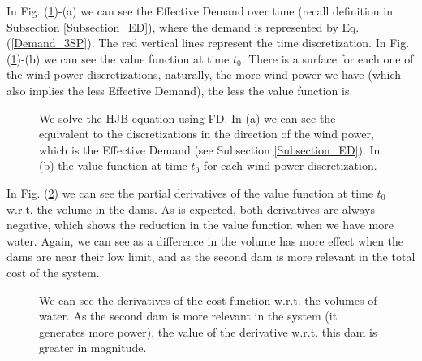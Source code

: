 In Fig. (\ref{Plot_SP3_2})-(a) we can see the Effective Demand over time (recall definition in Subsection \ref{Subsection_ED}), where the demand is represented by Eq. (\ref{Demand_3SP}). The red vertical lines represent the time discretization. In Fig. (\ref{Plot_SP3_2})-(b) we can see the value function at time $t_0$. There is a surface for each one of the wind power discretizations, naturally, the more wind power we have (which also implies the less Effective Demand), the less the value function is.

\begin{figure}[H]
\centering
{}\qquad
{}
\caption{We solve the HJB equation using FD. In (a) we can see the equivalent to the discretizations in the direction of the wind power, which is the Effective Demand (see Subsection \ref{Subsection_ED}). In (b) the value function at time $t_0$ for each wind power discretization.}
\label{Plot_SP3_2}
\end{figure}

In Fig. (\ref{Plot_SP3_3}) we can see the partial derivatives of the value function at time $t_0$ w.r.t. the volume in the dams. As is expected, both derivatives are always negative, which shows the reduction in the value function when we have more water. Again, we can see as a difference in the volume has more effect when the dams are near their low limit, and as the second dam is more relevant in the total cost of the system.

\begin{figure}[H]
\centering
{}\qquad
{}
\caption{We can see the derivatives of the cost function w.r.t. the volumes of water. As the second dam is more relevant in the system (it generates more power), the value of the derivative w.r.t. this dam is greater in magnitude.}
\label{Plot_SP3_3}
\end{figure}

